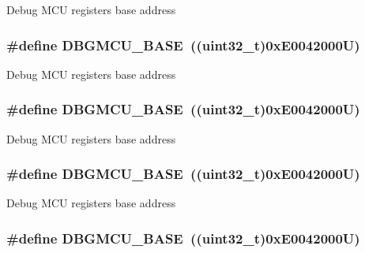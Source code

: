 Debug M\-C\-U registers base address \hypertarget{group___peripheral__memory__map_ga4adaf4fd82ccc3a538f1f27a70cdbbef}{
\subsubsection[{D\-B\-G\-M\-C\-U\-\_\-\-B\-A\-S\-E}]{\setlength{\rightskip}{0pt plus 5cm}\#define D\-B\-G\-M\-C\-U\-\_\-\-B\-A\-S\-E~((uint32\-\_\-t)0x\-E0042000\-U)}}\label{group___peripheral__memory__map_ga4adaf4fd82ccc3a538f1f27a70cdbbef}
Debug M\-C\-U registers base address \hypertarget{group___peripheral__memory__map_ga4adaf4fd82ccc3a538f1f27a70cdbbef}{
\subsubsection[{D\-B\-G\-M\-C\-U\-\_\-\-B\-A\-S\-E}]{\setlength{\rightskip}{0pt plus 5cm}\#define D\-B\-G\-M\-C\-U\-\_\-\-B\-A\-S\-E~((uint32\-\_\-t)0x\-E0042000\-U)}}\label{group___peripheral__memory__map_ga4adaf4fd82ccc3a538f1f27a70cdbbef}
Debug M\-C\-U registers base address \hypertarget{group___peripheral__memory__map_ga4adaf4fd82ccc3a538f1f27a70cdbbef}{
\subsubsection[{D\-B\-G\-M\-C\-U\-\_\-\-B\-A\-S\-E}]{\setlength{\rightskip}{0pt plus 5cm}\#define D\-B\-G\-M\-C\-U\-\_\-\-B\-A\-S\-E~((uint32\-\_\-t)0x\-E0042000\-U)}}\label{group___peripheral__memory__map_ga4adaf4fd82ccc3a538f1f27a70cdbbef}
Debug M\-C\-U registers base address \hypertarget{group___peripheral__memory__map_ga4adaf4fd82ccc3a538f1f27a70cdbbef}{
\subsubsection[{D\-B\-G\-M\-C\-U\-\_\-\-B\-A\-S\-E}]{\setlength{\rightskip}{0pt plus 5cm}\#define D\-B\-G\-M\-C\-U\-\_\-\-B\-A\-S\-E~((uint32\-\_\-t)0x\-E0042000\-U)}}\label{group___peripheral__memory__map_ga4adaf4fd82ccc3a538f1f27a70cdbbef}
